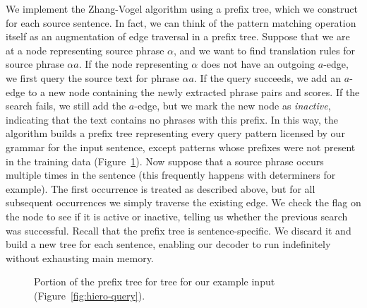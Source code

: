 We implement the Zhang-Vogel algorithm using
a prefix tree, which we construct for each source
sentence.  In fact, we can think of the pattern
matching operation itself as an augmentation of edge 
traversal in a prefix tree.  Suppose that we are at a
node representing source phrase $\alpha$, and we want to 
find translation rules for source phrase $\alpha{}a$.  
If the node representing $\alpha$ does not have
an outgoing $a$-edge, we first query the source text for
phrase $\alpha{}a$.  If the query succeeds, we add an
$a$-edge to a new node containing the newly extracted
phrase pairs and scores.  If the search fails, we still
add the $a$-edge, but we mark the new node as {\em inactive},
indicating that the text contains no phrases with this prefix.
In this way, the algorithm builds a prefix
tree representing every query pattern licensed by our grammar
for the input sentence, except patterns whose prefixes were
not present in the training data (Figure~\ref{fig:prefix-tree}).
Now suppose that a source phrase occurs multiple times
in the sentence (this frequently happens with determiners for example).
The first occurrence is treated as described above, but
for all subsequent occurrences we simply traverse the existing edge.
We check the flag on the node to see if it is active or inactive,
telling us whether the previous
search was successful.  Recall that the prefix tree is 
sentence-specific.  We discard it and build a new tree for 
each sentence, enabling our decoder to run indefinitely 
without exhausting main memory.

\figpreamble
\begin{figure}
	\figfontsize{
	\begin{center}
		
	\end{center}}
	\figpostamble
	\caption{Portion of the prefix tree for tree for our example input (Figure~\ref{fig:hiero-query}).}
	\label{fig:prefix-tree}
\end{figure}

